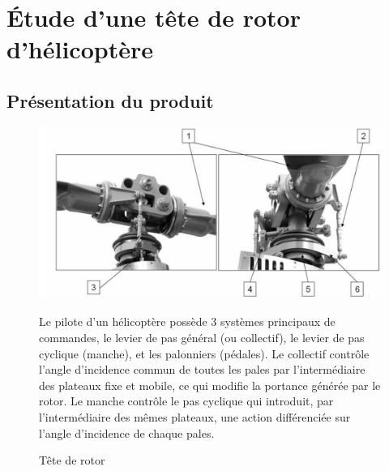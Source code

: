 

\section{Étude d'une tête de rotor d'hélicoptère}

\subsection{Présentation du produit}

\begin{figure}[htbp]
\begin{minipage}[c]{.40\linewidth}
\begin{center}
\includegraphics[width=\linewidth]{img/rotor.png}
\caption{Tête de rotor}
\label{fig:image1}
\end{center}
\end{minipage}
\hfill
\begin{minipage}[c]{.55\linewidth}
Le pilote d'un hélicoptère possède 3 systèmes principaux de commandes, le levier de pas général (ou collectif), le levier de pas cyclique (manche), et les palonniers (pédales). Le \og collectif \fg contrôle l'angle d'incidence commun de toutes les pales par l'intermédiaire des plateaux fixe et mobile, ce qui modifie la portance générée par le rotor. Le manche contrôle le pas cyclique qui introduit, par l'intermédiaire des mêmes plateaux, une action différenciée sur l'angle d'incidence de chaque pales.
\end{minipage}
\end{figure}

